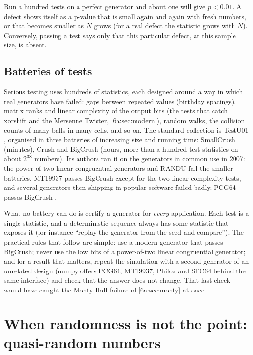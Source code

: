 \begin{pitfall}
Run a hundred tests on a perfect generator and about one will give $p<0.01$. A
defect shows itself as a p-value that is small again and again with fresh numbers,
or that becomes smaller as $N$ grows (for a real defect the statistic grows with
$N$). Conversely, passing a test says only that this particular defect, at this
sample size, is absent.
\end{pitfall}

\subsection{Batteries of tests}

Serious testing uses hundreds of statistics, each designed around a way in which
real generators have failed: gaps between repeated values (birthday spacings),
matrix ranks and linear complexity of the output bits (the tests that catch
xorshift and the Mersenne Twister, \cref{6a:sec:modern}), random walks, the
collision counts of many balls in many cells, and so on. The standard collection is
TestU01 \cite{LEcuyerSimard2007}, organised in three batteries of increasing size
and running time: SmallCrush (minutes), Crush and BigCrush (hours, more than a
hundred test statistics on about $2^{38}$ numbers). Its authors ran it on the
generators in common use in 2007: the power-of-two linear congruential generators
and RANDU fail the smaller batteries, MT19937 passes BigCrush except for the
two linear-complexity tests, and several generators then shipping in popular
software failed badly. PCG64 passes BigCrush \cite{ONeill2014}.

What no battery can do is certify a generator for \emph{every} application. Each
test is a single statistic, and a deterministic sequence always has some statistic
that exposes it (for instance ``replay the generator from the seed and compare'').
The practical rules that follow are simple: use a modern generator that passes
BigCrush; never use the low bits of a power-of-two linear congruential generator;
and for a result that matters, repeat the simulation with a second generator of an
unrelated design (numpy offers PCG64, MT19937, Philox and SFC64 behind the same
interface) and check that the answer does not change. That last check would have
caught the Monty Hall failure of \cref{6a:sec:monty} at once.
\section{When randomness is not the point: quasi-random numbers}
\label{6a:sec:qmc}

